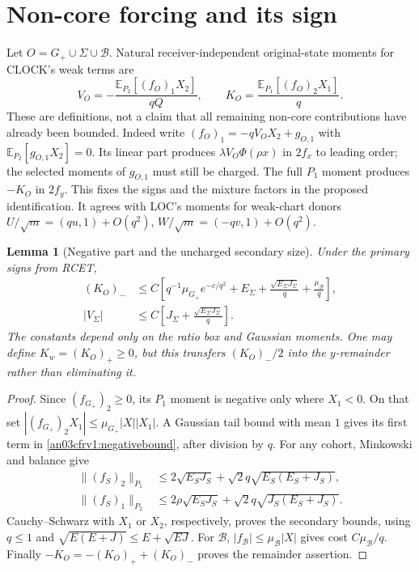 \documentclass[11pt]{article}
\newtheorem{lemma}[proposition]{Lemma}
\theoremstyle{remark}\newtheorem{remark}[proposition]{Remark}
\newcommand{\E}{\mathbb E}
\newcommand{\Gp}{G_+}
\newcommand{\BB}{\mathcal B}
\begin{document}
\section{Non-core forcing and its sign}
Let $O=\Gp\cup\Sigma\cup\BB$. Natural receiver-independent
original-state moments for CLOCK's weak terms are
\begin{equation}
 V_O=-\frac{\E_{P_2}[(f_O)_1X_2]}{qQ},\qquad
 K_O=\frac{\E_{P_1}[(f_O)_2X_1]}q .
 \label{an03cfrv1:VK}
\end{equation}
These are definitions, not a claim that all remaining
non-core contributions have already been bounded.
Indeed write $(f_O)_1=-qV_OX_2+g_{O,1}$ with
$\E_{P_2}[g_{O,1}X_2]=0$. Its linear part produces
$\lambda V_O\Phi(\rho x)$ in $2f_x$ to leading order;
the selected moments of $g_{O,1}$ must still be charged.
The full $P_1$ moment produces $-K_O$ in $2f_y$.
This fixes the signs and the mixture factors in the proposed
identification. It agrees with LOC's moments for weak-chart
donors $U/\sqrt m=(qu,1)+O(q^2)$,
$W/\sqrt m=(-qv,1)+O(q^2)$.

\begin{lemma}[Negative part and the uncharged secondary size]
\label{an03cfrv1:negative}
Under the primary signs from RCET,
\begin{align}
 (K_O)_-&\le C\left[
 q^{-1}\mu_{\Gp}e^{-c/q^2}
 +E_\Sigma+\frac{\sqrt{E_\Sigma J_\Sigma}}q
 +\frac{\mu_{\BB}}q\right],\label{an03cfrv1:negativebound}\\
 |V_\Sigma|&\le C\left[
 J_\Sigma+\frac{\sqrt{E_\Sigma J_\Sigma}}q\right].
 \label{an03cfrv1:Vsecondary}
\end{align}
The constants depend only on the ratio box and Gaussian moments.
One may define $K_w=(K_O)_+\ge0$, but this transfers
$(K_O)_-/2$ into the $y$-remainder rather than eliminating it.
\end{lemma}
\begin{proof}
Since $(f_{\Gp})_2\ge0$, its $P_1$ moment is negative only
where $X_1<0$. On that set
$|(f_{\Gp})_2X_1|\le\mu_{\Gp}|X||X_1|$.
A Gaussian tail bound with mean $1$ gives its first term in
\eqref{an03cfrv1:negativebound}, after division by $q$.
For any cohort, Minkowski and balance give
\begin{align*}
 \|(f_S)_2\|_{P_1}
 &\le2\sqrt{E_SJ_S}+\sqrt2q\sqrt{E_S(E_S+J_S)},\\
 \|(f_S)_1\|_{P_2}
 &\le2\rho\sqrt{E_SJ_S}+\sqrt2q\sqrt{J_S(E_S+J_S)}.
\end{align*}
Cauchy--Schwarz with $X_1$ or $X_2$, respectively, proves
the secondary bounds, using $q\le1$ and
$\sqrt{E(E+J)}\le E+\sqrt{EJ}$.
For $\BB$, $|f_{\BB}|\le\mu_{\BB}|X|$ gives cost
$C\mu_{\BB}/q$. Finally
$-K_O=-(K_O)_++(K_O)_-$ proves the remainder assertion.
\end{proof}
\end{document}
